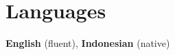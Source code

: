 \documentclass[a4paper,10pt]{article} %
\begin{document}


\section{Languages}
\textbf{English} (fluent), \textbf{Indonesian} (native)

\end{document}
